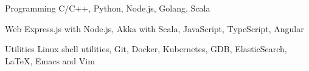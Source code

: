 


\begin{cvskills}


  \cvskill
  {Programming}
  {C/C++, Python, Node.js, Golang, Scala}


  \cvskill
  {Web}
  {Express.js with Node.js, Akka with Scala, JavaScript, TypeScript, Angular}



  \cvskill
  {Utilities}
  {Linux shell utilities, Git, Docker,
    Kubernetes, GDB, ElasticSearch, \LaTeX, Emacs and Vim}


\end{cvskills}

